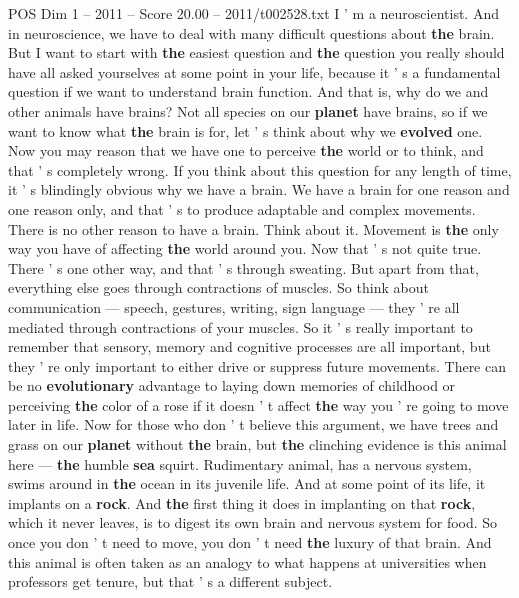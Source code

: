 \begin{textsample}{POS Dim 1 – 2011 – Score 20.00 – 2011/t002528.txt}  \label{ex:f1_pos_034}
I ' m a neuroscientist.
And in neuroscience, we have to deal with many difficult questions about \textbf{the} brain.
But I want to start with \textbf{the} easiest question and \textbf{the} question you really should have all asked yourselves at some point in your life, because it ' s a fundamental question if we want to understand brain function.
And that is, why do we and other animals have brains?
Not all species on our \textbf{planet} have brains, so if we want to know what \textbf{the} brain is for, let ' s think about why we \textbf{evolved} one.
Now you may reason that we have one to perceive \textbf{the} world or to think, and that ' s completely wrong.
If you think about this question for any length of time, it ' s blindingly obvious why we have a brain.
We have a brain for one reason and one reason only, and that ' s to produce adaptable and complex movements.
There is no other reason to have a brain.
Think about it.
Movement is \textbf{the} only way you have of affecting \textbf{the} world around you.
Now that ' s not quite true.
There ' s one other way, and that ' s through sweating.
But apart from that, everything else goes through contractions of muscles.
So think about communication — speech, gestures, writing, sign language — they ' re all mediated through contractions of your muscles.
So it ' s really important to remember that sensory, memory and cognitive processes are all important, but they ' re only important to either drive or suppress future movements.
There can be no \textbf{evolutionary} advantage to laying down memories of childhood or perceiving \textbf{the} color of a rose if it doesn ' t affect \textbf{the} way you ' re going to move later in life.
Now for those who don ' t believe this argument, we have trees and grass on our \textbf{planet} without \textbf{the} brain, but \textbf{the} clinching evidence is this animal here — \textbf{the} humble \textbf{sea} squirt.
Rudimentary animal, has a nervous system, swims around in \textbf{the} ocean in its juvenile life.
And at some point of its life, it implants on a \textbf{rock}.
And \textbf{the} first thing it does in implanting on that \textbf{rock}, which it never leaves, is to digest its own brain and nervous system for food.
So once you don ' t need to move, you don ' t need \textbf{the} luxury of that brain.
And this animal is often taken as an analogy to what happens at universities when professors get tenure, but that ' s a different subject.

\end{textsample}
